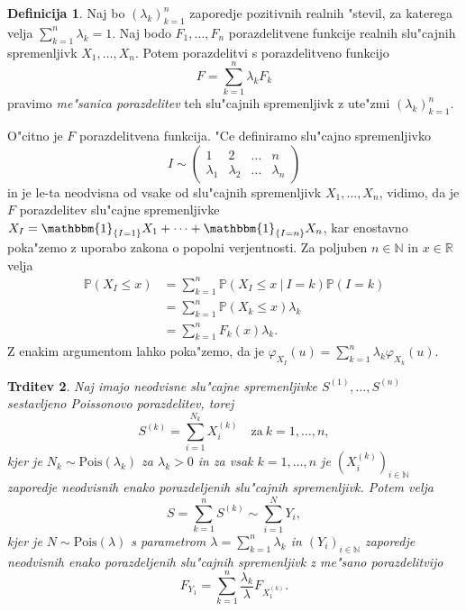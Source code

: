 \documentclass[12pt, a4paper, reqno]{amsart}
\theoremstyle{definition}
\newtheorem{definicija}{Definicija}[section]
\theoremstyle{plain}
\newtheorem{trditev}[definicija]{Trditev}
\newcommand{\R}{\mathbb{R}}
\newcommand{\N}{\mathbb{N}}
\newcommand{\Prob}{\mathbb{P}}
\newcommand{\1}{\mathds{1}}
\newcommand{\Pois}[1]{\text{Pois}(#1)}
\begin{document}
    \begin{definicija}
        Naj bo $(\lambda_k)_{k=1}^n$ zaporedje pozitivnih realnih "stevil, za katerega velja 
        $\sum_{k=1}^n\lambda_k = 1$. Naj bodo $F_1, \dots, F_n$ porazdelitvene funkcije
        realnih slu"cajnih spremenljivk $X_1, \dots, X_n$. Potem porazdelitvi s porazdelitveno 
        funkcijo 
        \begin{equation*}
            F = \sum_{k=1}^n\lambda_kF_k
        \end{equation*}
        pravimo \textit{me"sanica porazdelitev} teh slu"cajnih spremenljivk z ute"zmi $(\lambda_k)_{k=1}^n$.
    \end{definicija}
    \noindent
    O"citno je $F$ porazdelitvena funkcija. "Ce definiramo slu"cajno spremenljivko 
    $$
    I \sim 
    \begin{pmatrix}
        1 & 2  & \dots & n\\
        \lambda_1 & \lambda_2  & \dots & \lambda_n
    \end{pmatrix}
    $$
    in je le-ta neodvisna od vsake od slu"cajnih spremenljivk $X_1, \dots, X_n$, vidimo, da je $F$ 
    porazdelitev slu"cajne spremenljivke $X_I = \mathbbm{1}_{\{I = 1\}}X_1 + \cdots + \mathbbm{1}_{\{I = n\}}X_n$, 
    kar enostavno poka"zemo z uporabo zakona o popolni verjentnosti. Za poljuben $n\in\N$ in $x\in\R$ velja 
    \begin{align*}
        \Prob\left(X_I \leq x\right) 
        &= \sum_{k=1}^n\Prob\left(X_I \leq x \ \big| \ I = k\right)\Prob\left(I = k\right) \\
        &= \sum_{k=1}^n\Prob\left(X_k \leq x\right)\lambda_k \\
        &= \sum_{k=1}^nF_k(x)\lambda_k.
    \end{align*}
    Z enakim argumentom lahko poka"zemo, da je $\varphi_{X_I}(u) = \sum_{k=1}^n\lambda_k\varphi_{X_k}(u)$.


    \begin{trditev}
        Naj imajo neodvisne slu"cajne spremenljivke $S^{(1)}, \dots, S^{(n)}$ sestavljeno Poissonovo porazdelitev, torej 
        \begin{equation*}
            S^{(k)} = \sum_{i=1}^{N_k}X_i^{(k)} \quad \text{za} \ k=1, \dots, n,
        \end{equation*}
        kjer je $N_k\sim \Pois{\lambda_k}$ za $\lambda_k > 0$ in za vsak $k = 1, \dots, n$ je $(X_i^{(k)})_{i\in\N}$ 
        zaporedje neodvisnih enako porazdeljenih slu"cajnih spremenljivk. Potem velja   
        \begin{equation*}
            S = \sum_{k=1}^nS^{(k)} \sim \sum_{i=1}^{N}Y_i,
        \end{equation*}
        kjer je $N\sim\Pois{\lambda}$ s parametrom $\lambda = \sum_{k=1}^n\lambda_k$ in $(Y_i)_{i\in\N}$ zaporedje
        neodvisnih enako porazdeljenih slu"cajnih spremenljivk z me"sano porazdelitvijo
        \begin{equation*}
        F_{Y_1} = \sum_{k=1}^n\frac{\lambda_k}{\lambda}F_{X_1^{(k)}}.
        \end{equation*}
        \label{trd:vsotaCPDjeCPD}
    \end{trditev}
\end{document}
